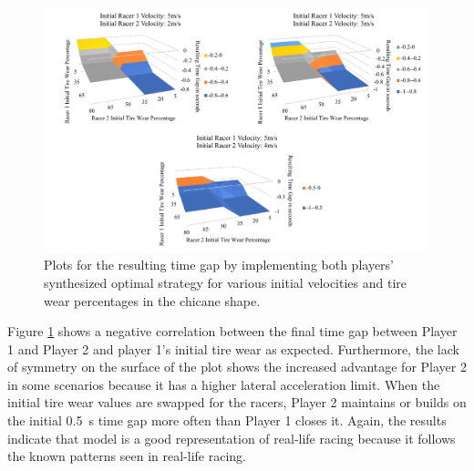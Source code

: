  \begin{figure}
\includegraphics[width=\textwidth]{Figures/ChicaneExpNew.pdf}
    \caption[Results of scenarios in chicane case study.] {Plots for the resulting time gap by implementing both players' synthesized optimal strategy for various initial velocities and tire wear percentages in the chicane shape.}
    \label{fig:ch_exp}
\end{figure}
 
 Figure \ref{fig:ch_exp} shows a negative correlation between the final time gap between Player 1 and Player 2 and player 1's initial tire wear as expected. Furthermore, the lack of symmetry on the surface of the plot shows the increased advantage for Player 2 in some scenarios because it has a higher lateral acceleration limit. When the initial tire wear values are swapped for the racers, Player 2 maintains or builds on the initial \SI{0.5}{\second} time gap more often than Player 1 closes it. Again, the results indicate that model is a good representation of real-life racing because it follows the known patterns seen in real-life racing. 

